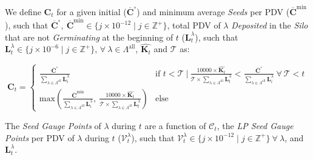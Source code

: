 \documentclass[tikz]{article}
\makeatletter
\newenvironment{keepunit}{%
  \par\penalty0\begingroup
  \edef\keepunitparskip{\the\parskip}%
  \noindent\begin{minipage}[t]{\linewidth}%
  \setlength{\parskip}{\keepunitparskip}%
  \@minipagefalse
}{%
  \end{minipage}\par\endgroup
}
\newcommand{\term}[1]{\textsl{#1}}
\makeatother
\begin{document}
\begin{keepunit}
We define $\mathbf{C}_{t}$ for a given initial ($\overline{\mathbf{C}}^{\circ}$) and minimum average \term{Seeds} per PDV ($\overline{\mathbf{C}}^{\text{min}}$), such that $\overline{\mathbf{C}}^{\circ},\ \overline{\mathbf{C}}^{\text{min}} \in \{j \times 10^{-12} \mid j \in \mathbb{Z}^{+} \}$, total PDV of $\lambda$ \term{Deposited} in the \term{Silo} that are not \term{Germinating} at the beginning of $t$ ($\mathbf{L}_{t}^{\lambda}$), such that $\mathbf{L}_{t}^{\lambda} \in \{j \times 10^{-6} \mid j \in \mathbb{Z}^{+} \}$, $\forall\ \lambda \in \Lambda^{\text{all}}$, $\widehat{\mathbf{K}_{t}}$ and $\mathscr{T}$ as: 

    $$ 
        \mathbf{C}_{t} = 
        \begin{cases}
            \frac{\overline{\mathbf{C}}^{\circ}}
                {\sum\limits_{\lambda \in \Lambda^{\text{all}}}
                                            \mathbf{L}_{i}^{\lambda}}
                & \text{if } t < \mathscr{T}\ |\
                \frac{10000 \times \widehat{\mathbf{K}_{t}}}
                        {\mathscr{T} \times 
                            \sum\limits_{\lambda \in \Lambda^{\text{all}}}{\mathbf{L}_{t}^{\lambda}}}
                < \frac{\overline{\mathbf{C}}^{\circ}}
                    {\sum\limits_{\lambda \in \Lambda^{\text{all}}} 
                                                \mathbf{L}_{i}^{\lambda}}\ \forall\ \mathscr{T} < t \\
                
            \text{max}
            \left(\frac{\overline{\mathbf{C}}^{\text{min}}}
                    {\sum\limits_{\lambda \in \Lambda^{\text{all}}}
                                                \mathbf{L}_{i}^{\lambda}},\ 
            \frac{10000 \times \widehat{\mathbf{K}_{t}}}
                    {\mathscr{T} \times 
                        \sum\limits_{\lambda \in \Lambda^{\text{all}}}{\mathbf{L}_{t}^{\lambda}}}
            \right)
                & \text{else}
        \end{cases}
    $$
\end{keepunit}

The \term{Seed Gauge Points} of $\lambda$ during $t$ are a function of $\mathscr{C}_{t}$, the \term{LP Seed Gauge Points} per PDV of $\lambda$ during $t$ ($\mathscr{V}_{t}^{\lambda}$), such that $\mathscr{V}_{t}^{\lambda} \in \{j \times 10^{-12} \mid j \in \mathbb{Z}^{+} \}\ \forall\ \lambda$, and $\mathbf{L}_{t}^{\lambda}$.
\end{document}
